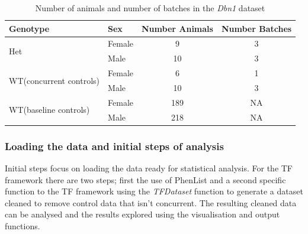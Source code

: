 \documentclass[12pt,a4paper]{article}
\begin{document}
\begin{table}[!h]
\begin{center}
\begin{tabular}{| l | l | c | c |}
  \hline
Genotype&Sex&Number Animals&Number Batches\\\hline
\multirow{2}{*}{Het}&Female&9&3\\
			    &Male&10&3\\
			    \hline
\multirow{2}{*}{WT(concurrent controls)}&Female&6&1\\
			    &Male&10&3\\
\multirow{2}{*}{WT(baseline controls)}&Female&189&NA\\
			    &Male&218&NA\\
\hline  
\end{tabular}
\caption{Number of animals and number of batches in the \textit{Dbn1} dataset}\label{table:08_tf}
\end{center}
\end{table}

\subsubsection{Loading the data and initial steps of analysis}
Initial steps focus on loading the data ready for statistical analysis. For the TF framework there are two steps; first the use of PhenList and a second specific function to the TF framework using the \textit{TFDataset} function to generate a dataset cleaned to remove control data that isn’t concurrent.  The resulting cleaned data can be analysed and the results explored using the visualisation and output functions. 
 
\end{document}
